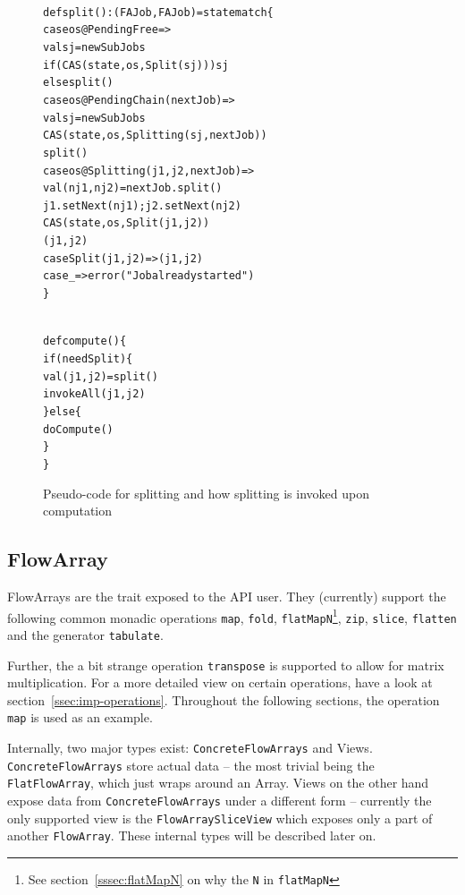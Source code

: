 \documentclass[runningheads,a4paper,fleqn]{llncs}
\begin{document}
\begin{figure}
\begin{minipage}[t]{7cm}
\begin{alltt}
{\scriptsize
def split(): (FAJob, FAJob) = state match \{
  case os@PendingFree =>
    val sj = newSubJobs
    if (CAS(state, os, Split(sj))) sj
    else split()
  case os@PendingChain(nextJob) =>
    val sj = newSubJobs
    CAS(state, os, Splitting(sj, nextJob))
    split()
  case os@Splitting(j1, j2, nextJob) =>
    val (nj1, nj2) = nextJob.split()
    j1.setNext(nj1); j2.setNext(nj2)
    CAS(state, os, Split(j1, j2))
    (j1, j2)
  case Split(j1, j2) => (j1, j2)
  case _ => error("Job already started")
\}
}
\end{alltt}
\end{minipage}
\begin{minipage}[t]{4cm}
\begin{alltt}
{\scriptsize
def compute() \{
  if (needSplit) \{
    val (j1, j2) = split()
    invokeAll(j1, j2)
  \} else \{
    doCompute()
  \}
\}
}
\end{alltt}
\end{minipage}
\caption{Pseudo-code for splitting and how splitting is invoked upon
  computation}
\label{fig:split-code}
\end{figure}

\subsection{FlowArray}
FlowArrays are the trait exposed to the API user. They (currently)
support the following common monadic operations \texttt{map},
\texttt{fold}, \texttt{flatMapN}\footnote{See
  section~\ref{sssec:flatMapN} on why the \texttt{N} in
  \texttt{flatMapN}}, \texttt{zip}, \texttt{slice}, \texttt{flatten}
and the generator \texttt{tabulate}.

Further, the a bit strange operation \texttt{transpose} is supported
to allow for matrix multiplication. For a more detailed view on
certain operations, have a look at
section~\ref{ssec:imp-operations}. Throughout the following sections,
the operation \texttt{map} is used as an example.

Internally, two major types exist: \texttt{ConcreteFlowArrays} and
Views. \texttt{ConcreteFlowArrays} store actual data -- the most
trivial being the \texttt{FlatFlowArray}, which just wraps around an
Array. Views on the other hand expose data from
\texttt{ConcreteFlowArrays} under a different form -- currently the
only supported view is the \texttt{FlowArraySliceView} which exposes
only a part of another \texttt{FlowArray}. These internal types will
be described later on.
\end{document}
